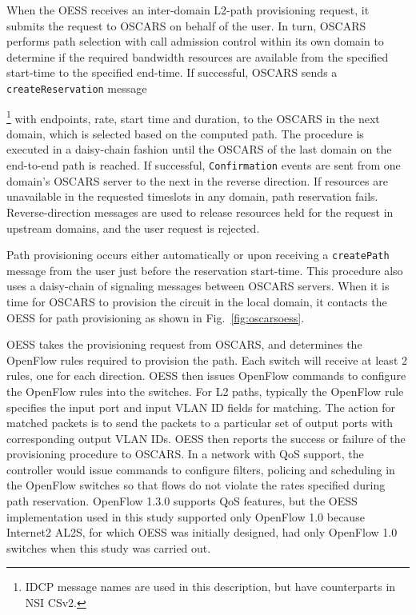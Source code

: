 When the OESS receives an inter-domain L2-path provisioning request, it submits the request to OSCARS on behalf of the user. In turn, OSCARS performs path selection with call admission control within its own domain to determine if the required bandwidth resources are available from the specified start-time to the specified end-time. If successful, OSCARS sends a \texttt{createReservation} message{\footnote{IDCP message names are used in this description, but have counterparts in NSI CSv2.} with endpoints, rate, start time
and duration, to the OSCARS in the next domain,
which is selected based on the computed path. The procedure is executed
in a daisy-chain fashion
until the OSCARS of the last domain on the end-to-end path
is reached. If successful, \texttt{Confirmation} events are sent from one
domain's OSCARS server to the next in the reverse direction. If resources are
unavailable in the requested timeslots in any domain, path reservation fails. Reverse-direction messages are used to release resources held for the request in upstream domains, and the user request is rejected.

Path provisioning occurs either automatically or upon receiving a \texttt{createPath} message from the user just before the reservation start-time.  This procedure also uses a daisy-chain of signaling messages between OSCARS servers.  When it is time for OSCARS to provision the circuit in the local domain, it contacts the OESS for path provisioning as shown in Fig.~\ref{fig:oscarsoess}.

OESS takes the provisioning request from OSCARS, and determines the OpenFlow rules required to provision the path. Each switch will receive at least 2 rules, one for each direction. OESS then issues OpenFlow commands
to configure the OpenFlow rules into the switches. For L2 paths,
typically the OpenFlow rule specifies the input port and input VLAN ID fields for matching. The action for matched packets is to send the packets to a particular set of output ports with corresponding output VLAN IDs. OESS then reports the success or failure of the provisioning procedure to OSCARS.  In a network with QoS support, the controller would issue commands to configure filters, policing and scheduling in the OpenFlow switches so that flows do not violate the rates specified during path reservation. OpenFlow 1.3.0 supports QoS features, but the OESS implementation used in this study supported only OpenFlow 1.0 because Internet2 AL2S, for which OESS was initially designed, had only OpenFlow 1.0 switches when this study was carried out.

}
